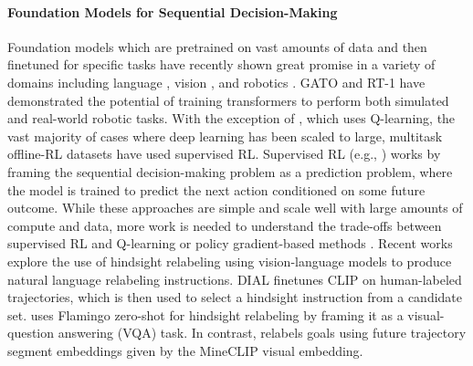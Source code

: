\paragraph{Foundation Models for Sequential Decision-Making}
Foundation models which are pretrained on vast amounts of data and then finetuned for specific tasks have recently shown great promise in a variety of domains including language \citep{brown2020language, palm, llama}, vision \citep{ramesh2022dalle2, caron2021emerging, radford2021clip}, and robotics \citep{brohan2022rt, shridhar2022cliport, jiang2022vima, nair2022r3m, xiao2022robotic}.
GATO \citep{reed2022gato} and RT-1 \citep{brohan2022rt} have demonstrated the potential of training transformers to perform both simulated and real-world robotic tasks. With the exception of \citet{kumar2023offline}, which uses Q-learning, the vast majority of cases \citep{lee2022multi, brohan2022rt, reed2022gato} where deep learning has been scaled to large, multitask offline-RL datasets have used supervised RL. Supervised RL (e.g., \citep{paster2020planning, ghosh2021gcsl, chen2021decision}) works by framing the sequential decision-making problem as a prediction problem, where the model is trained to predict the next action conditioned on some future outcome. While these approaches are simple and scale well with large amounts of compute and data, more work is needed to understand the trade-offs between supervised RL and Q-learning or policy gradient-based methods \citep{paster2022you, paster2022return, brandfonbrener2022does, udrl_stochastic}. Recent works explore the use of hindsight relabeling \citep{hindsight} using vision-language models \citep{radford2021clip, alayrac2022flamingo} to produce natural language relabeling instructions. DIAL \citep{xiao2022robotic} finetunes CLIP \citep{radford2021clip} on human-labeled trajectories, which is then used to select a hindsight instruction from a candidate set. \citet{sumers2023distilling} uses Flamingo \citep{alayrac2022flamingo} zero-shot for hindsight relabeling by framing it as a visual-question answering (VQA) task. In contrast, \agentname{} relabels goals using future trajectory segment embeddings given by the MineCLIP \citep{fan2022minedojo} visual embedding.




